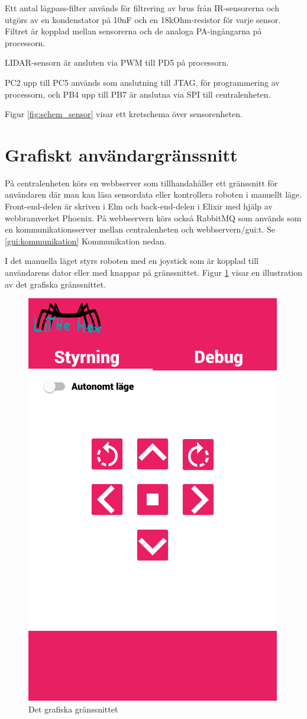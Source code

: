 \documentclass[a4paper,titlepage,12pt]{article}
\begin{document}
    Ett antal lågpass-filter används för filtrering av brus från IR-sensorerna
    och utgörs av en kondenstator på 10nF och en 18kOhm-resistor för varje
    sensor. Filtret är kopplad mellan sensorerna och de analoga PA-ingångarna på
    processorn.

    LIDAR-sensorn är ansluten via PWM till PD5 på processorn.

    PC2 upp till PC5 används som anslutning till JTAG, för programmering av
    processorn, och PB4 upp till PB7 är anslutna via SPI till centralenheten.

    Figur \ref{fig:schem_sensor} visar ett kretschema över sensorenheten.

	

    \newpage
	\section{Grafiskt användargränssnitt}
	På centralenheten körs en webbserver som tillhandahåller ett gränssnitt för
    användaren där man kan läsa sensordata eller kontrollera roboten i manuellt
    läge. Front-end-delen är skriven i Elm och back-end-delen i Elixir med hjälp
    av webbramverket Phoenix. På webbservern körs också RabbitMQ som används som
    en kommunikationsserver mellan centralenheten och webbservern/gui:t. Se
    \ref{gui:kommunikation} Kommunikation nedan.

	I det manuella läget styrs roboten med en joystick som är kopplad till
    användarens dator eller med knappar på gränssnittet. Figur
    \ref{fig:gui-overview} visar en illustration av det grafiska gränssnittet.
	
	\begin{figure}[h]
		\centering
		\includegraphics[width=0.5\linewidth]{images/gui-index.png}
		\caption{Det grafiska gränssnittet\label{fig:gui-overview}}
	\end{figure}
\end{document}
